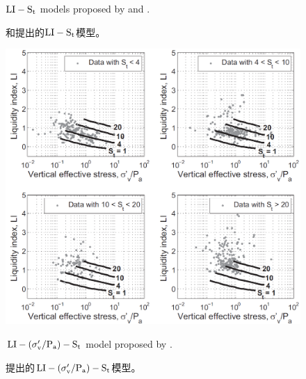 \begin{figure}[!p]
\begin{minipage}[t]{0.48\textwidth}
        \caption{$\rm{LI}-S_t$ models proposed by \citet{Bjerrum195449} and \citet{Ching2012522}.}
        \vspace{-5pt}
        \addtocounter{figure}{-1}
        \renewcommand{\figurename}{图}
        \caption{\citet{Bjerrum195449}和\citet{Ching2012522}提出的$\rm{LI}-S_t$模型。}
        \renewcommand{\figurename}{Figure}
    \end{minipage}
\end{figure}

\begin{figure}[!p]
    \centering
    \begin{minipage}[t]{0.48\textwidth}
        \centering
        \includegraphics[width=\textwidth]{figures/figure-4.png}
        \caption{$\rm{LI}-(\sigma_v'/P_a)-S_t$ model proposed by \citet{Mitchell1993}.}
        \vspace{-5pt}
        \addtocounter{figure}{-1}
        \renewcommand{\figurename}{图}
        \caption{\citet{Mitchell1993}提出的$\rm{LI}-(\sigma_v'/P_a)-S_t$模型。}
        \renewcommand{\figurename}{Figure}
    \end{minipage}
    \begin{minipage}[t]{0.48\textwidth}
        \centering

\end{minipage}
\end{figure}

